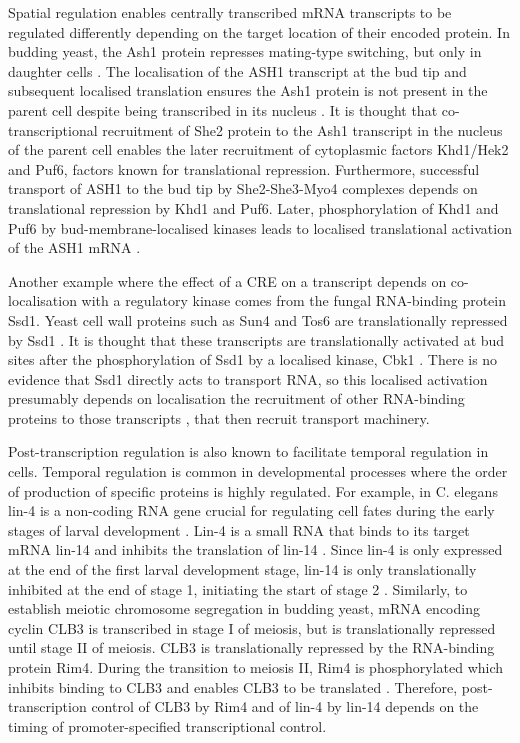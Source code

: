 \documentclass[../main.tex]{subfiles}
\begin{document}
Spatial regulation enables centrally transcribed mRNA transcripts to be regulated differently depending on the target location of their encoded protein.
In budding yeast, the Ash1 protein represses mating-type switching, but only in daughter
cells \parencite{Sil1996}.
The localisation of the ASH1 transcript at the bud tip and subsequent localised translation ensures the Ash1 protein is not present in the parent cell despite being transcribed in its nucleus \parencite{Niednery2014}. 
It is thought that co-transcriptional recruitment of She2 protein to the Ash1 transcript in the nucleus of the parent cell enables the later recruitment of cytoplasmic factors Khd1/Hek2 and Puf6, factors known for translational repression. 
Furthermore, successful transport of ASH1 to the bud tip by She2-She3-Myo4 complexes depends on translational repression by Khd1 and Puf6. 
Later, phosphorylation of Khd1 and Puf6 by bud-membrane-localised kinases leads to localised translational activation of the ASH1 mRNA \parencite{Paquin2007, Deng2008}.

Another example where the effect of a CRE on a transcript depends on co-localisation with a regulatory kinase comes from the fungal RNA-binding protein Ssd1. 
Yeast cell wall proteins such as Sun4 and Tos6 are translationally repressed by Ssd1 \parencite{Jansen2009}.
It is thought that these transcripts are translationally activated at bud sites after the phosphorylation of Ssd1 by a localised kinase, Cbk1 \parencite{Jansen2009, Kurischko2011}. 
There is no evidence that Ssd1 directly acts to transport RNA, so this localised activation presumably depends on localisation the recruitment of other RNA-binding proteins to those transcripts \parencite{Hogan2008, Bayne2021}, that then recruit transport machinery.

Post-transcription regulation is also known to facilitate temporal regulation in cells.  
Temporal regulation is common in developmental processes where the order of production of specific proteins is highly regulated. 
For example, in C. elegans lin-4 is a non-coding RNA gene crucial for regulating cell fates during the early stages of larval development \parencite{Wightman1993}. 
Lin-4 is a small RNA that binds to its target mRNA lin-14 and inhibits the translation of lin-14 \parencite{Lee1993}.
Since lin-4 is only expressed at the end of the first larval development stage, lin-14 is only translationally inhibited at the end of stage 1, initiating the start of stage 2 \parencite{Olsen1999}. 
Similarly, to establish meiotic chromosome segregation in budding yeast, mRNA encoding cyclin CLB3 is transcribed in stage I of meiosis, but is translationally repressed until stage II of meiosis. 
CLB3 is translationally repressed by the RNA-binding protein Rim4. 
During the transition to meiosis II, Rim4 is phosphorylated which inhibits binding to CLB3 and enables CLB3 to be translated \parencite{Berchowitz2013}. 
Therefore, post-transcription control of CLB3 by Rim4 and of lin-4 by lin-14 depends on the timing of promoter-specified transcriptional control.
\end{document}
